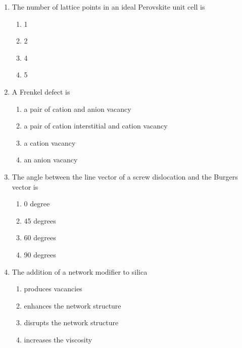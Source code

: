 \documentclass[a4paper,10pt]{article}
\begin{document}
\begin{enumerate}
\item The number of lattice points in an ideal Perovskite unit cell is
\hfill{}

\begin{multicols}{4}
\begin{enumerate}
\item 1
\item 2
\item 4
\item 5
\end{enumerate}
\end{multicols}

\item A Frenkel defect is
\hfill{}

\begin{enumerate}
\item a pair of cation and anion vacancy
\item a pair of cation interstitial and cation vacancy
\item a cation vacancy
\item an anion vacancy
\end{enumerate}

\item The angle between the line vector of a screw dislocation and the Burgers vector is
\hfill{}

\begin{multicols}{4}
\begin{enumerate}
\item 0 degree
\item 45 degrees
\item 60 degrees
\item 90 degrees
\end{enumerate}
\end{multicols}

\item The addition of a network modifier to silica
\hfill{}

\begin{enumerate}
\item produces vacancies
\item enhances the network structure
\item disrupts the network structure
\item increases the viscosity
\end{enumerate}


\end{enumerate}
\end{document}
